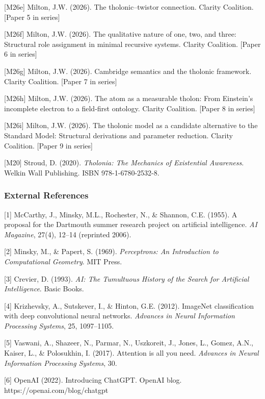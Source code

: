 \documentclass[
  11pt,
  letterpaper,
]{article}
\begin{document}
{[}M26e{]} Milton, J.W. (2026). The tholonic--twistor connection.
Clarity Coalition. {[}Paper 5 in series{]}

{[}M26f{]} Milton, J.W. (2026). The qualitative nature of one, two, and
three: Structural role assignment in minimal recursive systems. Clarity
Coalition. {[}Paper 6 in series{]}

{[}M26g{]} Milton, J.W. (2026). Cambridge semantics and the tholonic
framework. Clarity Coalition. {[}Paper 7 in series{]}

{[}M26h{]} Milton, J.W. (2026). The atom as a measurable tholon: From
Einstein's incomplete electron to a field-first ontology. Clarity
Coalition. {[}Paper 8 in series{]}

{[}M26i{]} Milton, J.W. (2026). The tholonic model as a candidate
alternative to the Standard Model: Structural derivations and parameter
reduction. Clarity Coalition. {[}Paper 9 in series{]}

{[}M20{]} Stroud, D. (2020). \emph{Tholonia: The Mechanics of
Existential Awareness}. Welkin Wall Publishing. ISBN 978-1-6780-2532-8.

\subsubsection{External References}\label{external-references}

{[}1{]} McCarthy, J., Minsky, M.L., Rochester, N., \& Shannon, C.E.
(1955). A proposal for the Dartmouth summer research project on
artificial intelligence. \emph{AI Magazine}, 27(4), 12--14 (reprinted
2006).

{[}2{]} Minsky, M., \& Papert, S. (1969). \emph{Perceptrons: An
Introduction to Computational Geometry}. MIT Press.

{[}3{]} Crevier, D. (1993). \emph{AI: The Tumultuous History of the
Search for Artificial Intelligence}. Basic Books.

{[}4{]} Krizhevsky, A., Sutskever, I., \& Hinton, G.E. (2012). ImageNet
classification with deep convolutional neural networks. \emph{Advances
in Neural Information Processing Systems}, 25, 1097--1105.

{[}5{]} Vaswani, A., Shazeer, N., Parmar, N., Uszkoreit, J., Jones, L.,
Gomez, A.N., Kaiser, L., \& Polosukhin, I. (2017). Attention is all you
need. \emph{Advances in Neural Information Processing Systems}, 30.

{[}6{]} OpenAI (2022). Introducing ChatGPT. OpenAI blog.
https://openai.com/blog/chatgpt
\end{document}
